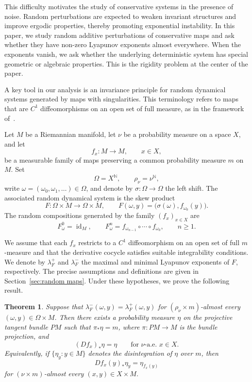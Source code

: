 \documentclass[a4paper,12pt,reqno]{amsart}
\numberwithin{equation}{section}
\newtheorem{theorem}{Theorem}[section]
\newcommand{\Nn}{{\mathbb{N}}}
\begin{document}
This difficulty motivates the study of conservative systems in the presence of noise. Random perturbations are expected to weaken invariant structures and improve ergodic properties, thereby promoting exponential instability. In this paper, we study random additive perturbations of conservative maps and ask whether they have non-zero Lyapunov exponents almost everywhere. When the exponents vanish, we ask whether the underlying deterministic system has special geometric or algebraic properties. This is the rigidity problem at the center of the paper. 

A key tool in our analysis is an invariance principle for random dynamical systems generated by maps with singularities. This terminology refers to maps that are $C^1$ diffeomorphisms on an open set of full measure, as in the framework of~\cite{Katok:1986tg}.

Let $M$ be a Riemannian manifold, let $\nu$ be a probability measure on a space $X$, and let
\[
f_x\colon M\to M,
\qquad x\in X,
\]
be a measurable family of maps preserving a common probability measure $m$ on $M$. Set
\[
\Omega=X^{\Nn},
\qquad
\rho_\nu=\nu^{\Nn},
\]
write $\omega=(\omega_0,\omega_1,\ldots) \in \Omega$, and denote by $\sigma\colon\Omega\to\Omega$ the left shift. The associated random dynamical system is the skew product
\[
F\colon\Omega\times M\to\Omega\times M,
\qquad
F(\omega,y)
=
\bigl(\sigma(\omega),f_{\omega_0}(y)\bigr).
\]
The random compositions generated by the family $(f_x)_{x\in X}$ are
\[
F_\omega^0=\operatorname{id}_M,
\qquad
F_\omega^n
=
f_{\omega_{n-1}}\circ\cdots\circ f_{\omega_0},
\qquad n\geq1.
\]

We assume that each $f_x$ restricts to a $C^1$ diffeomorphism on an open set of full $m$-measure and that the derivative cocycle satisfies suitable integrability conditions. We denote by $\lambda_F^+$ and $\lambda_F^-$ the maximal and minimal Lyapunov exponents of $F$, respectively. The precise assumptions and definitions are given in Section~\ref{sec:random maps}. Under these hypotheses, we prove the following result.

\begin{theorem}
Suppose that $\lambda_F^-(\omega,y) = \lambda_F^+(\omega,y)$ for $(\rho_\nu\times m)$-almost every $(\omega,y)\in\Omega\times M$. Then there exists a probability measure $\eta$ on the projective tangent bundle $PM$ such that $\pi_*\eta=m$, where $\pi\colon PM\to M$ is the bundle projection, and
\[
(Df_x)_*\eta=\eta
\qquad \text{for } \nu \text{-a.e. } x\in X.
\]
Equivalently, if $\{\eta_y:y\in M\}$ denotes the disintegration of $\eta$ over $m$, then
\[
Df_x(y)_*\eta_y
=
\eta_{f_x(y)}
\]
for $(\nu\times m)$-almost every $(x,y)\in X\times M$.
\end{theorem}
\end{document}
